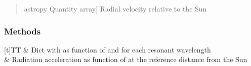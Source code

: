 \documentclass[letterpaper,10pt,english]{sphinxmanual}
\begin{document}
\begin{fulllineitems}
\begin{quote}
\begin{description}
\begin{description}
\sphinxlineitem{\sphinxstylestrong{velocity}}{[}astropy Quantity array{]}
\sphinxAtStartPar
Radial velocity relative to the Sun

\end{description}

\end{description}\end{quote}
\subsubsection*{Methods}


\begin{savenotes}\sphinxattablestart
\sphinxthistablewithglobalstyle
\centering
\begin{tabulary}{\linewidth}[t]{TT}
\sphinxtoprule
\sphinxtableatstartofbodyhook
\sphinxAtStartPar
{}
&
\sphinxAtStartPar
Dict with  as function of  and  for each resonant wavelength
\\
\sphinxhline
\sphinxAtStartPar
{}
&
\sphinxAtStartPar
Radiation acceleration as function of  at the reference distance from the Sun
\\
\sphinxbottomrule
\end{tabulary}
\sphinxtableafterendhook\par
\sphinxattableend\end{savenotes}


\end{fulllineitems}
\end{document}
